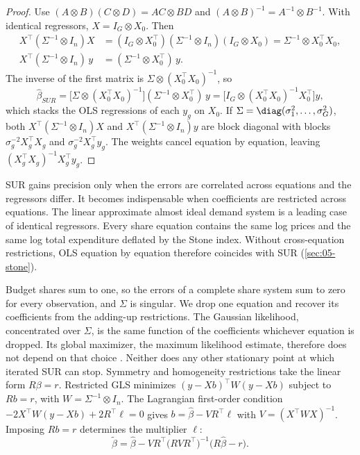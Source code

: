 \begin{proof}
Use $(A \otimes B)(C \otimes D) = AC \otimes BD$ and $(A \otimes B)^{-1} = A^{-1} \otimes B^{-1}$. With
identical regressors, $X = I_G \otimes X_0$. Then
\begin{align*}
X^\top(\Sigma^{-1}\otimes I_n)X &= (I_G \otimes X_0^\top)(\Sigma^{-1}\otimes I_n)(I_G \otimes X_0)
= \Sigma^{-1}\otimes X_0^\top X_0 ,\\
X^\top(\Sigma^{-1}\otimes I_n)\,y &= (\Sigma^{-1}\otimes X_0^\top)\,y .
\end{align*}
The inverse of the first matrix is $\Sigma \otimes (X_0^\top X_0)^{-1}$, so
\begin{equation*}
\hat\beta_{SUR} = \bigl[\Sigma \otimes (X_0^\top X_0)^{-1}\bigr](\Sigma^{-1}\otimes X_0^\top)\,y
= \bigl[I_G \otimes (X_0^\top X_0)^{-1}X_0^\top\bigr]y ,
\end{equation*}
which stacks the OLS regressions of each $y_g$ on $X_0$. If $\Sigma = \diag(\sigma_1^2, \dots, \sigma_G^2)$,
both $X^\top(\Sigma^{-1}\otimes I_n)X$ and $X^\top(\Sigma^{-1}\otimes I_n)y$ are block diagonal with blocks
$\sigma_g^{-2}X_g^\top X_g$ and $\sigma_g^{-2}X_g^\top y_g$. The weights cancel equation by equation, leaving
$(X_g^\top X_g)^{-1}X_g^\top y_g$.
\end{proof}

SUR gains precision only when the errors are correlated across equations and the regressors differ. It
becomes indispensable when coefficients are restricted across equations. The linear approximate almost ideal demand
system is a leading case of identical regressors. Every share equation contains the same log prices and the same log
total expenditure deflated by the Stone index. Without cross-equation restrictions, OLS equation by equation therefore
coincides with SUR (\cref{sec:05-stone}).

Budget shares sum to one, so the errors of a complete share system sum to zero for every observation, and
$\Sigma$ is singular. We drop one equation and recover its coefficients from the adding-up restrictions. The
Gaussian likelihood, concentrated over $\Sigma$, is the same function of the coefficients whichever equation is
dropped. Its global maximizer, the maximum likelihood estimate, therefore does not depend on that choice
\citep{Barten1969}. Neither does any other stationary point at which iterated SUR can stop.
Symmetry and homogeneity restrictions take the linear form $R\beta = r$. Restricted GLS minimizes
$(y - Xb)^\top W(y - Xb)$ subject to $Rb = r$, with $W = \Sigma^{-1}\otimes I_n$. The Lagrangian first-order
condition $-2X^\top W(y - Xb) + 2R^\top\ell = 0$ gives $b = \hat\beta - VR^\top\ell$ with
$V = (X^\top WX)^{-1}$. Imposing $Rb = r$ determines the multiplier $\ell$:
\begin{equation}\label{eq:A-restricted-gls}
\tilde\beta = \hat\beta - VR^\top\bigl(RVR^\top\bigr)^{-1}\bigl(R\hat\beta - r\bigr) .
\end{equation}

